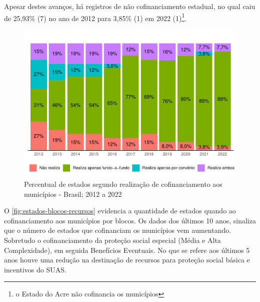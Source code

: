 \documentclass[
  brazilian]{report}
\begin{document}
Apesar destes avanços, há registros de não cofinanciamento estadual, no
qual caiu de 25,93\% (7) no ano de 2012 para 3,85\% (1) em 2022
(1)\footnote{o Estado do Acre não cofinancia os municípios}.

\begin{figure}
\includegraphics{Censo-SUAS-2022_files/figure-latex/estados-cofinanciamento-municipios-1} \caption[Percentual de estados segundo realização de cofinanciamento aos municípios - Brasil]{Percentual de estados segundo realização de cofinanciamento aos municípios - Brasil; 2012 a 2022}\label{fig:estados-cofinanciamento-municipios}
\end{figure}

O \cref{fig:estados-blocos-recursos} evidencia a quantidade de estados
quando ao cofinanciamento aos municípios por blocos. Os dados dos
últimos 10 anos, sinaliza que o número de estados que cofinanciam os
municípios vem aumentando. Sobretudo o cofinanciamento da proteção
social especial (Média e Alta Complexidade), em seguida Benefícios
Eventuais. No que se refere aos últimos 5 anos houve uma redução na
destinação de recursos para proteção social básica e incentivos do SUAS.
\end{document}
